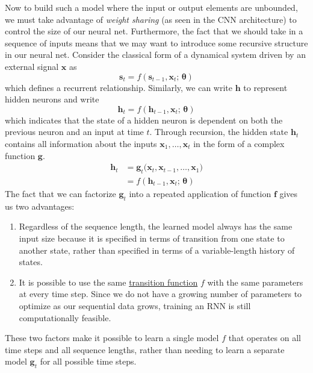 \documentclass{article}
\begin{document}
  Now to build such a model where the input or output elements are unbounded, we must take advantage of \textit{weight sharing} (as seen in the CNN architecture) to control the size of our neural net. Furthermore, the fact that we should take in a sequence of inputs means that we may want to introduce some recursive structure in our neural net. Consider the classical form of a dynamical system driven by an external signal $\mathbf{x}$ as 
  \begin{equation}
    \mathbf{s}_t = f(\mathbf{s}_{t-1}, \mathbf{x}_t; \, \boldsymbol{\theta} )
  \end{equation}
  which defines a recurrent relationship. Similarly, we can write $\mathbf{h}$ to represent hidden neurons and write 
  \begin{equation}
    \mathbf{h}_t = f(\mathbf{h}_{t-1}, \mathbf{x}_t; \, \boldsymbol{\theta} )
  \end{equation}
  which indicates that the state of a hidden neuron is dependent on both the previous neuron and an input at time $t$. Through recursion, the hidden state $\mathbf{h}_t$ contains all information about the inputs $\mathbf{x}_1, \ldots, \mathbf{x}_t$ in the form of a complex function $\mathbf{g}$. 
  \begin{align}
      \mathbf{h}_t & = \mathbf{g}_t \big( \mathbf{x}_t, \mathbf{x}_{t - 1}, \ldots, \mathbf{x}_1 \big) \\
      & = f(\mathbf{h}_{t - 1}, \mathbf{x}_t; \, \boldsymbol{\theta}) 
  \end{align}
  The fact that we can factorize $\mathbf{g}_t$ into a repeated application of function $\mathbf{f}$ gives us two advantages: 
  \begin{enumerate}
      \item Regardless of the sequence length, the learned model always has the same input size because it is specified in terms of transition from one state to another state, rather than specified in terms of a variable-length history of states. 

      \item It is possible to use the same \hyperref[sm-def:transition-function]{transition function} $f$ with the same parameters at every time step. Since we do not have a growing number of parameters to optimize as our sequential data grows, training an RNN is still computationally feasible. 
  \end{enumerate}
  These two factors make it possible to learn a single model $f$ that operates on all time steps and all sequence lengths, rather than needing to learn a separate model $\mathbf{g}_t$ for all possible time steps. 
\end{document}
